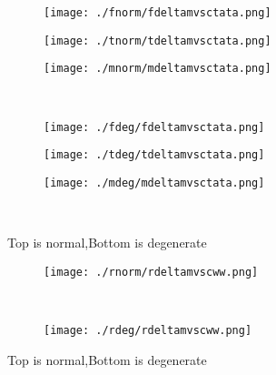 \documentclass[aps,floats,floatfix,nofootinbib]{revtex4-1}
\begin{document}
\begin{center}
\begin{figure}
\begin{subfigure}{0.3\textwidth}
\texttt{[image: ./fnorm/fdeltamvsctata.png]}
\label{}
\end{subfigure}
\begin{subfigure}{0.3\textwidth}
\texttt{[image: ./tnorm/tdeltamvsctata.png]}
\label{}
\end{subfigure}
\begin{subfigure}{0.3\textwidth}
\texttt{[image: ./mnorm/mdeltamvsctata.png]}
\label{}
\end{subfigure}\\
\begin{subfigure}{0.3\textwidth}
\texttt{[image: ./fdeg/fdeltamvsctata.png]}
\label{}
\end{subfigure}
\begin{subfigure}{0.3\textwidth}
\texttt{[image: ./tdeg/tdeltamvsctata.png]}
\label{}
\end{subfigure}
\begin{subfigure}{0.3\textwidth}
\texttt{[image: ./mdeg/mdeltamvsctata.png]}
\label{}
\end{subfigure}\\
\caption{Top is normal,Bottom is degenerate}
\end{figure}
\end{center}

\begin{center}
\begin{figure}
\begin{subfigure}{1.0\textwidth}
\texttt{[image: ./rnorm/rdeltamvscww.png]}
\label{}
\end{subfigure}\\
\begin{subfigure}{1.0\textwidth}
\texttt{[image: ./rdeg/rdeltamvscww.png]}
\label{}
\end{subfigure}
\caption{Top is normal,Bottom is degenerate}
\end{figure}
\end{center}
\end{document}
